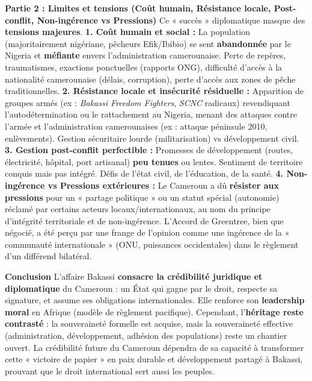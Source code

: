 \documentclass[11pt]{article}
\newcommand{\cle}[1]{{\popxbold\color{popdark}#1}}
\begin{document}
\begin{corrige}
\textbf{Partie 2 : Limites et tensions (Coût humain, Résistance locale, Post-conflit, Non-ingérence vs Pressions)}
Ce « succès » diplomatique masque des \textbf{tensions majeures}.
\textbf{1. Coût humain et social :} La population (majoritairement nigériane, pêcheurs Efik/Ibibio) se sent \textbf{abandonnée} par le Nigeria et \textbf{méfiante} envers l'administration camerounaise. Perte de repères, traumatismes, exactions ponctuelles (rapports ONG), difficulté d'accès à la nationalité camerounaise (délais, corruption), perte d'accès aux zones de pêche traditionnelles.
\textbf{2. Résistance locale et insécurité résiduelle :} Apparition de groupes armés (ex : \textit{Bakassi Freedom Fighters}, \textit{SCNC} radicaux) revendiquant l'autodétermination ou le rattachement au Nigeria, menant des attaques contre l'armée et l'administration camerounaises (ex : attaque péninsule 2010, enlèvements). Gestion sécuritaire lourde (militarisation) vs développement civil.
\textbf{3. Gestion post-conflit perfectible :} Promesses de développement (routes, électricité, hôpital, port artisanal) \textbf{peu tenues} ou lentes. Sentiment de \cle{territoire conquis mais pas intégré}. Défis de l'état civil, de l'éducation, de la santé.
\textbf{4. Non-ingérence vs Pressions extérieures :} Le Cameroun a dû \textbf{résister aux pressions} pour un « partage politique » ou un statut spécial (autonomie) réclamé par certains acteurs locaux/internationaux, au nom du principe d'\cle{intégrité territoriale} et de \cle{non-ingérence}. L'Accord de Greentree, bien que négocié, a été perçu par une frange de l'opinion comme une \cle{ingérence} de la « communauté internationale » (ONU, puissances occidentales) dans le règlement d'un différend bilatéral.

\textbf{Conclusion}
L'affaire Bakassi \textbf{consacre la crédibilité juridique et diplomatique} du Cameroun : un État qui gagne par le droit, respecte sa signature, et assume ses obligations internationales. Elle renforce son \textbf{leadership moral} en Afrique (modèle de règlement pacifique). Cependant, l'\textbf{héritage reste contrasté} : la \cle{souveraineté} formelle est acquise, mais la \cle{souveraineté effective} (administration, développement, adhésion des populations) reste un chantier ouvert. La crédibilité future du Cameroun dépendra de sa capacité à transformer cette « victoire de papier » en \cle{paix durable} et \cle{développement partagé} à Bakassi, prouvant que le droit international sert aussi les peuples.
\end{corrige}
\end{document}
